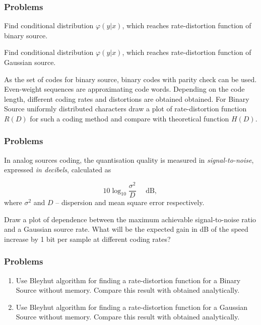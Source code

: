 \documentclass[14pt]{beamer}
\begin{document}
\begin{frame}
\frametitle{Problems}
\begin{enumerate}
\small{

    \item[5]
    Find conditional distribution $\varphi(y|x)$, which reaches rate-distortion function of binary source.
    
    \pause
    \item[6]
    Find conditional distribution $\varphi(y|x)$, which reaches rate-distortion function of Gaussian source.
    
    \pause
    \item[7]
    As the set of codes for binary source, binary codes with parity check can be used. Even-weight sequences are approximating code words.
    Depending on the code length, different coding rates and distortions are obtained obtained.
    For Binary Source uniformly distributed characters draw a plot of rate-distortion function $R(D)$ for such a coding method and compare with theoretical function $H(D)$.
}
\end{enumerate}
\end{frame}

\begin{frame}
\frametitle{Problems}
\begin{enumerate}
\small{

    \item[8] \label{gain_db}
    In analog sources coding, the quantisation quality is measured in \emph{signal-to-noise}, expressed \emph{in decibels}, calculated as
    
    \[
    10 \log_{10}\frac{\sigma^2}{D}\quad \mbox{ dB, }
    \]
    where $\sigma^2$ and $D$ -- dispersion and mean square error respectively.
    
    Draw a plot of dependence between the maximum achievable signal-to-noise ratio and a Gaussian source rate. 
    What will be the expected gain in dB of the speed increase by 1 bit per sample at different coding rates?
}
\end{enumerate}
\end{frame}


\begin{frame}
\frametitle{Problems}
\begin{enumerate}

    \item[9]
    Use Bleyhut algorithm for finding a
    rate-distortion function for a Binary Source
    without memory. Compare this result with
    obtained analytically.
    
    \pause
    \item[10]
    Use Bleyhut algorithm for finding a
    rate-distortion function for a Gaussian Source
    without memory. Compare this result with
    obtained analytically.

\end{enumerate}
\end{frame}
\end{document}

